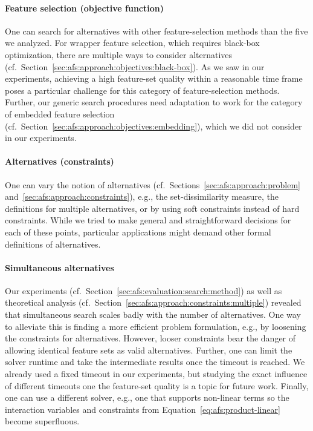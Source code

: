 \documentclass{article}
\theoremstyle{definition}
\begin{document}
\paragraph{Feature selection (objective function)}

One can search for alternatives with other feature-selection methods than the five we analyzed.
For wrapper feature selection, which requires black-box optimization, there are multiple ways to consider alternatives (cf.~Section~\ref{sec:afs:approach:objectives:black-box}).
As we saw in our experiments, achieving a high feature-set quality within a reasonable time frame poses a particular challenge for this category of feature-selection methods.
Further, our generic search procedures need adaptation to work for the category of embedded feature selection (cf.~Section~\ref{sec:afs:approach:objectives:embedding}), which we did not consider in our experiments.

\paragraph{Alternatives (constraints)}

One can vary the notion of alternatives (cf.~Sections~\ref{sec:afs:approach:problem} and~\ref{sec:afs:approach:constraints}), e.g., the set-dissimilarity measure, the definitions for multiple alternatives, or by using soft constraints instead of hard constraints.
While we tried to make general and straightforward decisions for each of these points, particular applications might demand other formal definitions of alternatives.

\paragraph{Simultaneous alternatives}

Our experiments (cf.~Section~\ref{sec:afs:evaluation:search:method}) as well as theoretical analysis (cf.~Section~\ref{sec:afs:approach:constraints:multiple}) revealed that simultaneous search scales badly with the number of alternatives.
One way to alleviate this is finding a more efficient problem formulation, e.g., by loosening the constraints for alternatives.
However, looser constraints bear the danger of allowing identical feature sets as valid alternatives.
Further, one can limit the solver runtime and take the intermediate results once the timeout is reached.
We already used a fixed timeout in our experiments, but studying the exact influence of different timeouts one the feature-set quality is a topic for future work.
Finally, one can use a different solver, e.g., one that supports non-linear terms so the interaction variables and constraints from Equation~\ref{eq:afs:product-linear} become superfluous.
\end{document}
